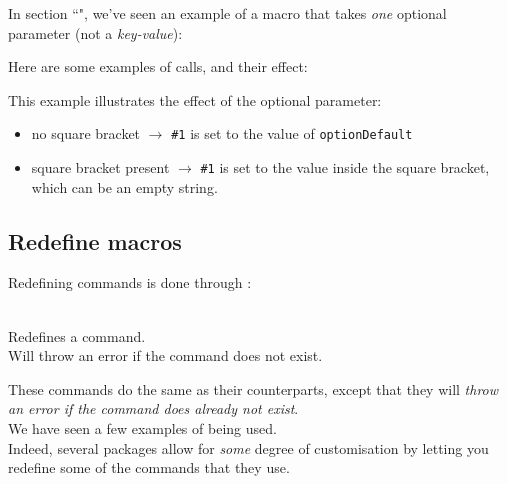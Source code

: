 \bigskip

In section ``", we've seen an example of a macro that takes \emph{one} optional parameter (not a \emph{key-value}):


Here are some examples of calls, and their effect:


This example illustrates the effect of the optional parameter:
\begin{itemize}
	\item no square bracket $\rightarrow$ \texttt{\#1} is set to the value of \texttt{optionDefault}
	\item square bracket present $\rightarrow$ \texttt{\#1} is set to the value inside the square bracket, which can be an empty string.
\end{itemize}


\newpage

\subsection{Redefine macros}


Redefining commands is done through :

\begin{description}
	\setlength{\itemsep}{-0.5em}
	
	\item[\quoteCmd{renewcommand}\texttt{\{\textbackslash cmd\}\{definition\}}]
	\item[\quoteCmd{renewcommand*}\texttt{\{\textbackslash cmd\}\{definition\}}] \mbox{} \\
	Redefines a command. \\
	Will throw an error if the command does not exist.
\end{description}


These commands do the same as their  counterparts, except that they will \emph{throw an error if the command does already not exist}. \\

We have seen a few examples of  being used. \\

Indeed, several packages allow for \emph{some} degree of customisation by letting you redefine some of the commands that they use. \\

